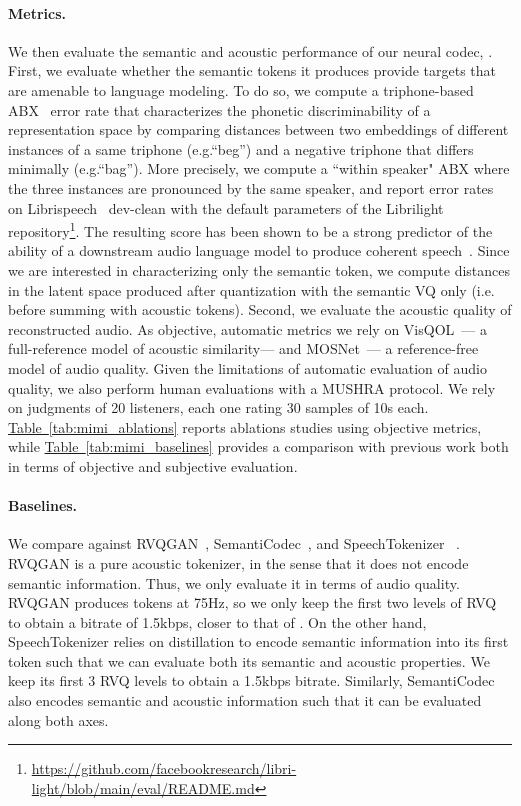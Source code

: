 \paragraph{Metrics.}
We then evaluate the semantic and acoustic performance of our neural codec, \mimi. First, we evaluate whether the semantic tokens it produces provide targets that are amenable to language modeling. To do so, we compute a triphone-based ABX~\citep{abx} error rate that characterizes the phonetic discriminability of a representation space by comparing distances between two embeddings of different instances of a same triphone (e.g.``beg'') and a negative triphone that differs minimally (e.g.``bag''). More precisely, we compute a ``within speaker" ABX where the three instances are pronounced by the same speaker, and report error rates on Librispeech~\citep{librispeech} dev-clean with the default parameters of the Librilight \citep{librilight} repository\footnote{\url{https://github.com/facebookresearch/libri-light/blob/main/eval/README.md}}. The resulting score has been shown to be a strong predictor of the ability of a downstream audio language model to produce coherent speech~\citep{gslm}. Since we are interested in characterizing only the semantic token, we compute distances in the latent space produced after quantization with the semantic VQ only (i.e. before summing with acoustic tokens). 
Second, we evaluate the acoustic quality of reconstructed audio. As objective, automatic metrics we rely on VisQOL~\citep{hines2015visqol}--- a full-reference model of acoustic similarity--- and MOSNet~\citep{mosnet}--- a reference-free model of audio quality. Given the limitations of automatic evaluation of audio quality, we also perform human evaluations with a MUSHRA protocol. We rely on judgments of 20 listeners, each one rating 30 samples of 10s each. \hyperref[tab:mimi_ablations]{Table~\ref{tab:mimi_ablations}} reports ablations studies using objective metrics, while \hyperref[tab:mimi_baselines]{Table~\ref{tab:mimi_baselines}} provides a comparison with previous work both in terms of objective and subjective evaluation.


\paragraph{Baselines.}
We compare against RVQGAN~\citep{kumar2024high}, SemantiCodec~\citep{liu2024semanticodec}, and SpeechTokenizer ~\citep{zhang2024speechtokenizer}. RVQGAN is a pure acoustic tokenizer, in the sense that it does not encode semantic information. Thus, we only evaluate it in terms of audio quality. RVQGAN produces tokens at 75Hz, so we only keep the first two levels of RVQ to obtain a bitrate of 1.5kbps, closer to that of \mimi{}. On the other hand, SpeechTokenizer relies on distillation to encode semantic information into its first token such that we can evaluate both its semantic and acoustic properties. We keep its first 3 RVQ levels to obtain a 1.5kbps bitrate. Similarly, SemantiCodec also encodes semantic and acoustic information such that it can be evaluated along both axes.


